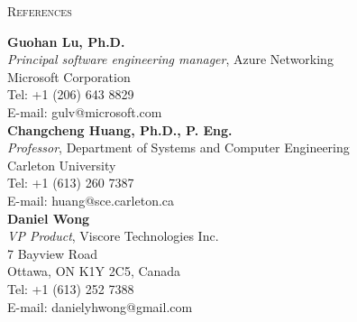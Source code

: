 \documentclass[letterpaper,11pt]{article}
\newcommand{\resheading}[1]{{\noindent\large \colorbox{mygrey}{
\begin{minipage}{1.0\textwidth}{\textsc{#1 \vphantom{p\^{E}}}}\end{minipage}}}}
\begin{document}
\resheading{References}%

\leftskip 0.2in %


%
%
\vspace{0.2in}%
\textbf{Guohan Lu, Ph.D.}\\
\textit{Principal software engineering manager}, Azure Networking\\
Microsoft Corporation\\
Tel: +1 (206) 643 8829\\
E-mail: gulv@microsoft.com\\


\vspace{0.2in}%
\textbf{Changcheng Huang, Ph.D., P. Eng.}\\
\textit{Professor}, Department of Systems and Computer Engineering\\
Carleton University\\
Tel: +1 (613) 260 7387\\
E-mail: huang@sce.carleton.ca\\



\vspace{0.2in}%
\textbf{Daniel Wong}\\
\textit{VP Product}, Viscore Technologies Inc.\\
7 Bayview Road\\
Ottawa, ON K1Y 2C5, Canada\\
Tel: +1 (613) 252 7388\\
E-mail: danielyhwong@gmail.com\\
\end{document}
